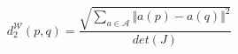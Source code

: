 
\begin{equation}\label{eq:metric_jacobian}
  d^{\mathcal{W}}_2(p,q) = \frac{\sqrt{\sum_{a \in \mathcal{A}} {\Vert a(p) - a(q) \Vert}^2}}{det(J)}
\end{equation}	

